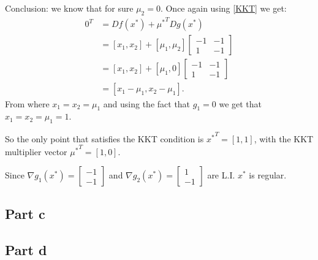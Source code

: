 \documentclass{article}
\begin{document}
Conclusion: we know that for sure $\mu_2=0$. Once again using
\ref{KKT} we get:
\begin{align*}
0^T&=Df(x^*)+{\mu^*}^TDg(x^*)\\
&=[x_1,x_2]+[\mu_1,\mu_2]\begin{bmatrix}
-1 & -1\\
1 & -1
\end{bmatrix}\\
&=[x_1,x_2]+[\mu_1,0]\begin{bmatrix}
-1 & -1\\
1 & -1
\end{bmatrix}\\
&=[ x_1-\mu_1, x_2-\mu_1].
\end{align*}
From where $x_1=x_2=\mu_1$ and using the fact that $g_1=0$ we get that
$x_1=x_2=\mu_1=1$.

So the only point that satisfies the KKT condition is ${x^*}^T=[1,1]$, with the
KKT multiplier vector ${\mu^*}^T=[1,0]$.

Since $\nabla g_1(x^*)=\begin{bmatrix} -1\\-1\end{bmatrix}$ and $\nabla
g_2(x^*)=\begin{bmatrix} 1\\-1\end{bmatrix}$ are L.I. $x^*$ is regular.
\subsection*{Part c}
\subsection*{Part d}
\end{document}
